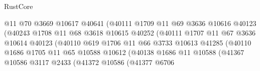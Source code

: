\begin{lexlean}{RustCore}
\begin{coremodule}
                                    @11
                                    @70
                                    @3669
                                    @10617
                                    @40641
                                    (@40111
                                      @1709
                                      @11
                                      @69
                                      @3636
                                      @10616
                                      @40123
                                      (@40243
                                        @1708
                                        @11
                                        @68
                                        @3618
                                        @10615
                                        @40252
                                        (@40111
                                          @1707
                                          @11
                                          @67
                                          @3636
                                          @10614
                                          @40123
                                          (@40110
                                            @619
                                            @1706
                                            @11
                                            @66
                                            @3733
                                            @10613
                                            @41285
                                            (@40110
                                              @1686
                                              @1705
                                              @11
                                              @65
                                              @10588
                                              @10612
                                              (@40138
                                                @1686
                                                @11
                                                @10588
                                                (@41367
                                                  @10586
                                                  @3117
                                                  @2433
                                                  (@41372
                                                    @10586
                                                    (@41377
                                                      @6706

\end{coremodule}
\end{lexlean}

